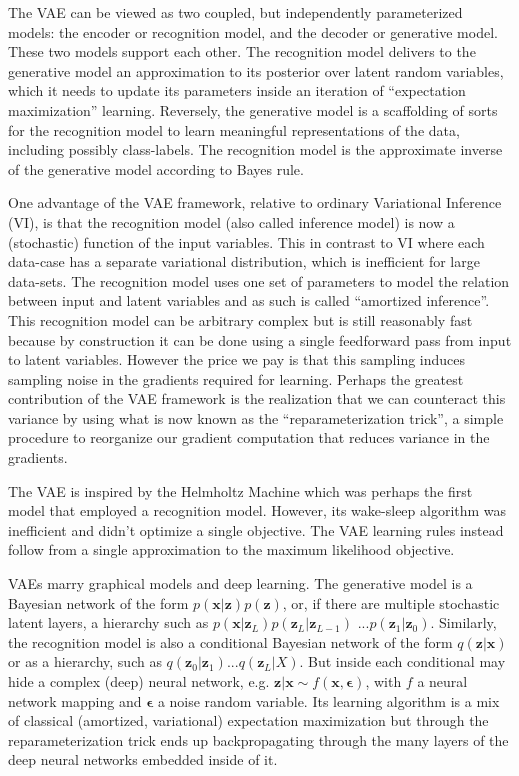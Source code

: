 \documentclass[MAL,biber]{nowfnt} %
\newcommand{\bb}[1]{\mathbf{#1}}
\newcommand{\bx}{\bb{x}}
\newcommand{\bz}{\bb{z}}
\newcommand{\beps}{\boldsymbol{\epsilon}}
\begin{document}
The VAE can be viewed as two coupled, but independently parameterized models: the encoder or recognition model, and the decoder or generative model. These two models support each other. The recognition model delivers to the generative model an approximation to its posterior over latent random variables, which it needs to update its parameters inside an iteration of ``expectation maximization'' learning. Reversely, the generative model is a scaffolding of sorts for the recognition model to learn meaningful representations of the data, including possibly class-labels. The recognition model is the approximate inverse of the generative model according to Bayes rule. 

One advantage of the VAE framework, relative to ordinary Variational Inference (VI), is that the recognition model (also called inference model) is now a (stochastic) function of the input variables. This in contrast to VI where each data-case has a separate variational distribution, which is inefficient for large data-sets. The recognition model uses one set of parameters to model the relation between input and latent variables and as such is called ``amortized inference''. This recognition model can be arbitrary complex but is still reasonably fast because by construction it can be done using a single feedforward pass from input to latent variables. However the price we pay is that this sampling induces sampling noise in the gradients required for learning. Perhaps the greatest contribution of the VAE framework is the realization that we can counteract this variance by using what is now known as the ``reparameterization trick'', a simple procedure to reorganize our gradient computation that reduces variance in the gradients.

The VAE is inspired by the Helmholtz Machine \citep{dayan1995helmholtz} which was perhaps the first model that employed a recognition model. However, its wake-sleep algorithm was inefficient and didn't optimize a single objective. The VAE learning rules instead follow from a single approximation to the maximum likelihood objective.   

VAEs marry graphical models and deep learning. The generative model is a Bayesian network of the form $p(\bx|\bz) p(\bz)$, or, if there are multiple stochastic latent layers, a hierarchy such as $p(\bx|\bz_L) p(\bz_L|\bz_{L-1})$ $... p(\bz_1|\bz_0)$. Similarly, the recognition model is also a  conditional Bayesian network of the form $q(\bz|\bx)$ or as a hierarchy, such as $q(\bz_0|\bz_1) ... q(\bz_L|X)$. But inside each conditional may hide a complex (deep) neural network, e.g. $\bz|\bx \sim f(\bx,\beps)$, with $f$ a neural network mapping and $\beps$ a noise random variable. Its learning algorithm is a mix of classical (amortized, variational) expectation maximization but through the reparameterization trick ends up backpropagating through the many layers of the deep neural networks embedded inside of it. 
\end{document}
